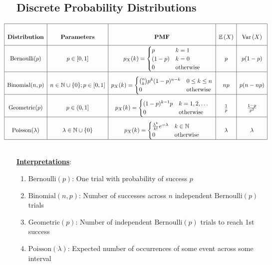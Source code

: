 \documentclass[12pt]{extarticle}
\newcommand{\pstart}[0]{\noindent}
\newcommand{\newp}[0]{~\\\pstart}
\newcommand{\titleul}[1]{\pstart\textbf{\ul{#1}}}
\theoremstyle{definition}
\theoremstyle{remark}
\newcommand{\expected}[1]{\mathbb{E}\left(#1\right)}
\newcommand{\variance}[1]{\text{Var}\left(#1\right)}
\newcommand{\bernoulli}[1]{\text{Bernoulli}(#1)}
\newcommand{\binomial}[2]{\text{Binomial}(#1,#2)}
\newcommand{\geometric}[1]{\text{Geometric}(#1)}
\newcommand{\poisson}[1]{\text{Poisson}(#1)}
\begin{document}
\subsection{Discrete Probability Distributions}
\pstart
\[\hskip-0.75cm\def\arraystretch{3}
\begin{array}{|c|c|c|c|c|}
    \hline \textbf{Distribution} & \textbf{Parameters} & \textbf{PMF} & 
\expected{X} & \variance{X} \\ \hline

    \bernoulli{p} & p\in[0,1] & p_X(k)=\begin{cases}
        p & k=1\\ (1-p) & k=0 \\ 0 & \text{otherwise}
    \end{cases} & p & p(1-p) \\ \hline
    
    \binomial{n}{p} & n\in\mathbb{N}\cup\{0\};p\in[0,1] & 
p_X(k)=\begin{cases}
        \binom{n}{k}p^k(1-p)^{n-k} & 0\leq k\leq n \\ 0 & \text{otherwise}
    \end{cases}
         & np & p(n-np) \\ \hline
         
    \geometric{p} & p\in(0,1] & p_X(k)=\begin{cases}
        (1-p)^{k-1}p & k=1,2,\hdots \\ 0 & \text{otherwise}
    \end{cases}
         & \frac{1}{p} & \frac{1-p}{p^2} \\ \hline
         
    \poisson{\lambda} & \lambda\in\mathbb{N}\cup\{0\} & 
p_X(k)=\begin{cases}
        \frac{\lambda^k}{k!}e^{-\lambda} & k\in\mathbb{N} \\ 0 & 
\text{otherwise}
    \end{cases}
        & \lambda & \lambda \\ \hline
\end{array}\]

\newp
\titleul{Interpretations}: \begin{enumerate}
    \item $\bernoulli{p}$: One trial with probability of success $p$ \\
    \item $\binomial{n}{p}$: Number of successes across $n$ independent 
$\bernoulli{p}$ trials \\
    \item $\geometric{p}$: Number of independent $\bernoulli{p}$ trials to 
reach 1st success \\
    \item $\poisson{\lambda}$: Expected number of occurrences of some 
event across some interval
\end{enumerate}
\end{document}
